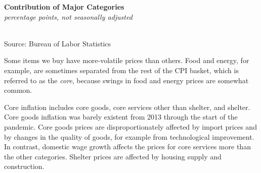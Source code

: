 \documentclass{report}
\newcommand{\tbllink}[1]{\href{https://raw.githubusercontent.com/bdecon/US-chartbook/master/chartbook/data/#1}{\faTable}}
\newcommand{\barylab}[2]{yticklabel style={text width=#1, align=right, 
		style={black!70}, text height=#2},}
\newcommand{\bbar}[2]{extra #1 ticks = {{#2}}, extra #1 tick labels = ,
		extra #1 tick style = {grid=major, grid style={thick, black!25}},}
\newcommand{\barplotnogrid}{xbar=0pt, axis line style={draw=none},
	    yticklabel style={align=left, anchor=east},
      		xmajorticks=false, ymajorgrids=false,   
	    ytick=data, tickwidth=0pt, area legend, reverse legend,
	    nodes near coords align={horizontal},}
\begin{document}
{{\begin{minipage}{0.36\textwidth}
\small 
\end{minipage} \hspace{6mm}
\begin{minipage}{0.35\textwidth}
\normalsize \textbf{Contribution of Major Categories}\\
\footnotesize{\textit{percentage points, not seasonally adjusted}}\\
\hspace*{-2mm} \\
\footnotesize{Source: Bureau of Labor Statistics} \hfill \tbllink{cpi_comp.csv}
\end{minipage}
\newpage
\begin{minipage}{0.76\textwidth}
\small Some items we buy have more-volatile prices than others. Food and energy, for example, are sometimes separated from the rest of the CPI basket, which is referred to as the \textit{core}, because swings in food and energy prices are somewhat common. 

Core inflation includes core goods, core services other than shelter, and shelter. Core goods inflation was barely existent from 2013 through the start of the pandemic. Core goods prices are disproportionately affected by import prices and by changes in the quality of goods, for example from technological improvement. In contrast, domestic wage growth affects the prices for core services more than the other categories. Shelter prices are affected by housing supply and construction. 


\end{minipage}}}
\end{document}
